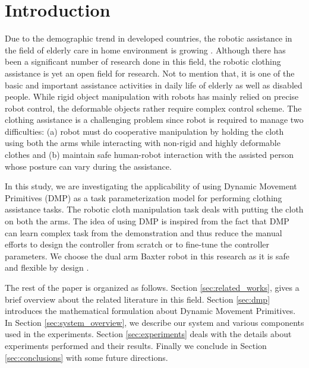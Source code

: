 \documentclass[sigconf]{acmart}
\begin{document}
\section{Introduction}
\label{sec:introduction}
Due to the demographic trend in developed countries, the robotic assistance in the field of elderly care in home environment is growing \cite{broekens2009assistive}. Although there has been a significant number of research done in this field, the robotic clothing assistance is yet an open field for research. Not to mention that, it is one of the basic and important assistance activities in daily life of elderly as well as disabled people. While rigid object manipulation with robots has mainly relied on precise robot control, the deformable objects rather require complex control scheme. The clothing assistance is a challenging problem since robot is required to manage two difficulties: (a) robot must do cooperative manipulation by holding the cloth using both the arms while interacting with non-rigid and highly deformable clothes and (b) maintain safe human-robot interaction with the assisted person whose posture can vary during the assistance.

In this study, we are investigating the applicability of using Dynamic Movement Primitives (DMP) as a task parameterization model for performing clothing assistance tasks. The robotic cloth manipulation task deals with putting the cloth on both the arms. The idea of using DMP is inspired from the fact that DMP can learn complex task from the demonstration \cite{ijspeert2003learning, schaal2006dynamic, ijspeert2013dynamical} and thus reduce the manual efforts to design the controller from scratch or to fine-tune the controller parameters. We choose the dual arm Baxter robot in this research as it is safe and flexible by design \cite{fitzgerald2013developing}.

The rest of the paper is organized as follows. Section \ref{sec:related_works}, gives a brief overview about the related literature in this field. Section \ref{sec:dmp} introduces the mathematical formulation about Dynamic Movement Primitives. In Section \ref{sec:system_overview}, we describe our system and various components used in the experiments. Section \ref{sec:experiments} deals with the details about experiments performed and their results. Finally we conclude in Section \ref{sec:conclusions} with some future directions.
\end{document}
